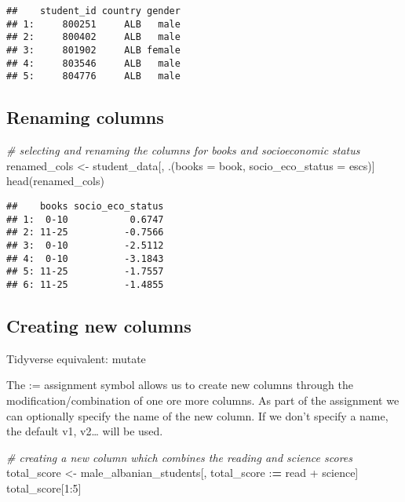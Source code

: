 \documentclass[
]{article}
\newenvironment{Shaded}{\begin{snugshade}}{\end{snugshade}}
\newcommand{\AttributeTok}[1]{\textcolor[rgb]{0.77,0.63,0.00}{#1}}
\newcommand{\CommentTok}[1]{\textcolor[rgb]{0.56,0.35,0.01}{\textit{#1}}}
\newcommand{\DecValTok}[1]{\textcolor[rgb]{0.00,0.00,0.81}{#1}}
\newcommand{\ErrorTok}[1]{\textcolor[rgb]{0.64,0.00,0.00}{\textbf{#1}}}
\newcommand{\FunctionTok}[1]{\textcolor[rgb]{0.00,0.00,0.00}{#1}}
\newcommand{\NormalTok}[1]{#1}
\newcommand{\OtherTok}[1]{\textcolor[rgb]{0.56,0.35,0.01}{#1}}
\newcommand{\SpecialCharTok}[1]{\textcolor[rgb]{0.00,0.00,0.00}{#1}}
\begin{document}
\begin{verbatim}
##    student_id country gender
## 1:     800251     ALB   male
## 2:     800402     ALB   male
## 3:     801902     ALB female
## 4:     803546     ALB   male
## 5:     804776     ALB   male
\end{verbatim}

\hypertarget{renaming-columns}{%
\subsection{Renaming columns}\label{renaming-columns}}

\begin{Shaded}
\begin{Highlighting}[]
\CommentTok{\# selecting and renaming the columns for books and socioeconomic status}
\NormalTok{renamed\_cols }\OtherTok{\textless{}{-}}\NormalTok{ student\_data[, .(}\AttributeTok{books =}\NormalTok{ book, }\AttributeTok{socio\_eco\_status =}\NormalTok{ escs)]}
\FunctionTok{head}\NormalTok{(renamed\_cols)}
\end{Highlighting}
\end{Shaded}

\begin{verbatim}
##    books socio_eco_status
## 1:  0-10           0.6747
## 2: 11-25          -0.7566
## 3:  0-10          -2.5112
## 4:  0-10          -3.1843
## 5: 11-25          -1.7557
## 6: 11-25          -1.4855
\end{verbatim}

\hypertarget{creating-new-columns}{%
\subsection{Creating new columns}\label{creating-new-columns}}

{Tidyverse equivalent: mutate}

The := assignment symbol allows us to create new columns through the
modification/combination of one ore more columns. As part of the
assignment we can optionally specify the name of the new column. If we
don't specify a name, the default v1, v2\ldots{} will be used.

\begin{Shaded}
\begin{Highlighting}[]
\CommentTok{\# creating a new column which combines the reading and science scores}
\NormalTok{total\_score }\OtherTok{\textless{}{-}}\NormalTok{ male\_albanian\_students[, }
\NormalTok{  total\_score }\SpecialCharTok{:}\ErrorTok{=}\NormalTok{ read }\SpecialCharTok{+}\NormalTok{ science]}
\NormalTok{total\_score[}\DecValTok{1}\SpecialCharTok{:}\DecValTok{5}\NormalTok{]}
\end{Highlighting}
\end{Shaded}
\end{document}
